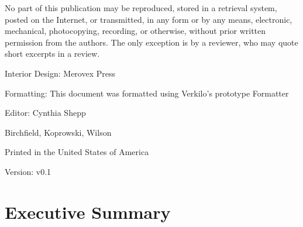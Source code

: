 \documentclass[11pt,openany]{book}
\begin{document}
  \footnotesize
  \par\noindent No part of this publication may be reproduced, stored in
a retrieval system, posted on the Internet, or transmitted, in any form
or by any means, electronic, mechanical, photocopying, recording, or
otherwise, without prior written permission from the authors. The only
exception is by a reviewer, who may quote short excerpts in a
review.\newline


  \footnotesize
  

  \par\noindent Interior Design: Merovex Press %
      \par\noindent Formatting: This document was formatted using
Verkilo's prototype Formatter
      \par\noindent Editor: Cynthia Shepp
  \newline

  \par\noindent       \par\noindent Birchfield, Koprowski, Wilson
    \newline

  
  \par\noindent Printed in the United States of America
  \newline

  
    \par\noindent Version: v0.1
    \vspace*{\fill}
  \clearpage\normalsize

  
              {
            \makeatletter
      \renewcommand*\l@section{\@dottedtocline{1}{1.5em}{3.0em}}
      \makeatother
      \setcounter{tocdepth}{2}
      \tableofcontents
    }
      
      \listoftables
  
      \listoffigures
  
\newpage %

\pagestyle{fancy}
\chapter{Executive Summary}
\end{document}
